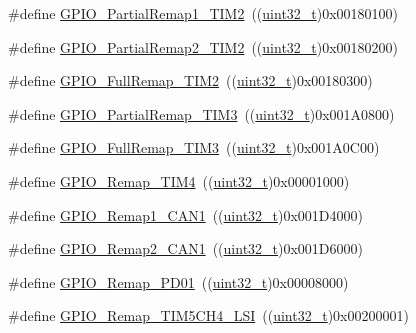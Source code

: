 \begin{DoxyCompactItemize}
\item 
\#define \hyperlink{group___g_p_i_o___remap__define_ga7ad69d3e2643b2bfee4eebbea4a5b80e}{G\+P\+I\+O\+\_\+\+Partial\+Remap1\+\_\+\+T\+I\+M2}~((\hyperlink{_p_e___types_8h_a33594304e786b158f3fb30289278f5af}{uint32\+\_\+t})0x00180100)
\item 
\#define \hyperlink{group___g_p_i_o___remap__define_ga42908e73dfc201d0a7b4ab0ed6f15eb7}{G\+P\+I\+O\+\_\+\+Partial\+Remap2\+\_\+\+T\+I\+M2}~((\hyperlink{_p_e___types_8h_a33594304e786b158f3fb30289278f5af}{uint32\+\_\+t})0x00180200)
\item 
\#define \hyperlink{group___g_p_i_o___remap__define_ga2bd999e77236155935d2a598d4bac2a9}{G\+P\+I\+O\+\_\+\+Full\+Remap\+\_\+\+T\+I\+M2}~((\hyperlink{_p_e___types_8h_a33594304e786b158f3fb30289278f5af}{uint32\+\_\+t})0x00180300)
\item 
\#define \hyperlink{group___g_p_i_o___remap__define_gaaced3961a038fd8b41abfaf55d24f609}{G\+P\+I\+O\+\_\+\+Partial\+Remap\+\_\+\+T\+I\+M3}~((\hyperlink{_p_e___types_8h_a33594304e786b158f3fb30289278f5af}{uint32\+\_\+t})0x001\+A0800)
\item 
\#define \hyperlink{group___g_p_i_o___remap__define_ga8ba8cef32c5076db1872e173f873dae6}{G\+P\+I\+O\+\_\+\+Full\+Remap\+\_\+\+T\+I\+M3}~((\hyperlink{_p_e___types_8h_a33594304e786b158f3fb30289278f5af}{uint32\+\_\+t})0x001\+A0\+C00)
\item 
\#define \hyperlink{group___g_p_i_o___remap__define_ga041b2f02b32895ce34bcd7499c9e873f}{G\+P\+I\+O\+\_\+\+Remap\+\_\+\+T\+I\+M4}~((\hyperlink{_p_e___types_8h_a33594304e786b158f3fb30289278f5af}{uint32\+\_\+t})0x00001000)
\item 
\#define \hyperlink{group___g_p_i_o___remap__define_ga89ac81224968d8faf42475be664c1e09}{G\+P\+I\+O\+\_\+\+Remap1\+\_\+\+C\+A\+N1}~((\hyperlink{_p_e___types_8h_a33594304e786b158f3fb30289278f5af}{uint32\+\_\+t})0x001\+D4000)
\item 
\#define \hyperlink{group___g_p_i_o___remap__define_gad4f5b46cf24bed1563b22e6ecca3ebef}{G\+P\+I\+O\+\_\+\+Remap2\+\_\+\+C\+A\+N1}~((\hyperlink{_p_e___types_8h_a33594304e786b158f3fb30289278f5af}{uint32\+\_\+t})0x001\+D6000)
\item 
\#define \hyperlink{group___g_p_i_o___remap__define_gaeac44191de99d55a5fa03e29b74d5e59}{G\+P\+I\+O\+\_\+\+Remap\+\_\+\+P\+D01}~((\hyperlink{_p_e___types_8h_a33594304e786b158f3fb30289278f5af}{uint32\+\_\+t})0x00008000)
\item 
\#define \hyperlink{group___g_p_i_o___remap__define_gad909488d0b7a0cfa1116a66e962e3c62}{G\+P\+I\+O\+\_\+\+Remap\+\_\+\+T\+I\+M5\+C\+H4\+\_\+\+L\+SI}~((\hyperlink{_p_e___types_8h_a33594304e786b158f3fb30289278f5af}{uint32\+\_\+t})0x00200001)

\end{DoxyCompactItemize}
